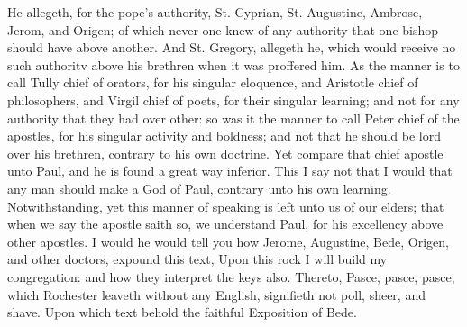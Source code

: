 He allegeth, for the pope's authority, St. Cyprian, 
St. Augustine, Ambrose, Jerom, and Origen; of which 
never one knew of any authority that one bishop should 
have above another. And St. Gregory, allegeth he, which 
would receive no such authoritv above his brethren when it 
was proffered him. As the manner is to call Tully chief 
of orators, for his singular eloquence, and Aristotle chief 
of philosophers, and Virgil chief of poets, for their singular
learning; and not for any authority that they had 
over other: so was it the manner to call Peter chief of the 
apostles, for his singular activity and boldness; and not 
that he should be lord over his brethren, contrary to his 
own doctrine. Yet compare that chief apostle unto Paul, 
and he is found a great way inferior. This I say not that 
I would that any man should make a God of Paul, contrary
unto his own learning. Notwithstanding, yet this 
manner of speaking is left unto us of our elders; that 
when we say the apostle saith so, we understand Paul, for 
his excellency above other apostles. I would he would 
tell you how Jerome, Augustine, Bede, Origen, and other 
doctors, expound this text, Upon this rock I will build my 
congregation: and how they interpret the keys also. 
Thereto, Pasce, pasce, pasce, which Rochester leaveth 
without any English, signifieth not poll, sheer, and shave. 
Upon which text behold the faithful Exposition of Bede. 

